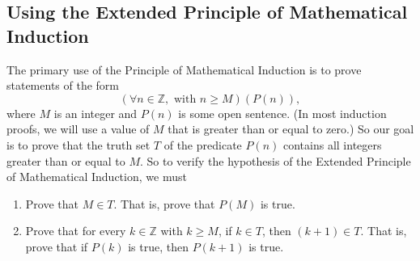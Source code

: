 \subsection*{Using the Extended Principle of Mathematical Induction}
The primary use of the Principle of Mathematical Induction is to prove statements of the form
\[
\left( {\forall n \in \mathbb{Z},\text{ with } n \geq M} \right)\left( {P( n )} \right)\!,
\]
where  $M$  is an integer and  $P( n )$ is some open sentence. (In most induction proofs, we will use a value of $M$ that is greater than or equal to zero.)  So our goal is to prove that the truth set  $T$  of the predicate   $P( n )$ contains all integers greater than or equal to  $M$\!.  So to verify the hypothesis of the Extended Principle of Mathematical Induction, we must
\begin{enumerate}
\item Prove that  $M \in T$\!.  That is, prove that  $P( M )$ is true.

\item Prove that for every  $k \in \mathbb{Z}$ with $k \geq M$\!, if  $k \in T$\!, then  
$\left( {k + 1} \right) \in T$\!.  That is, prove that if  $P( k )$ is true, then  
$P( {k + 1} )$ is true.

\end{enumerate}


